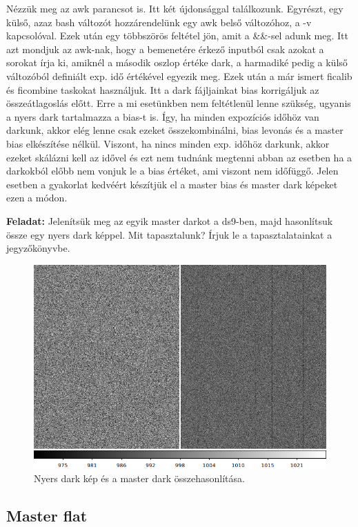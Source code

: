 \documentclass{article}
\begin{document}
Nézzük meg az awk parancsot is. Itt két újdonsággal találkozunk. Egyrészt, egy
külső, azaz bash változót hozzárendelünk egy awk belső változóhoz, a -v
kapcsolóval. Ezek után egy többszörös feltétel jön, amit a \&\&-sel adunk meg.
Itt azt mondjuk az awk-nak, hogy a bemenetére érkező inputból csak azokat a
sorokat írja ki, amiknél a második oszlop értéke dark, a harmadiké pedig a külső
változóból definiált exp. idő értékével egyezik meg.
Ezek után a már ismert ficalib és ficombine taskokat használjuk. Itt a dark
fájljainkat bias korrigáljuk az összeátlagoslás előtt. Erre a mi esetünkben nem
feltétlenül lenne szükség, ugyanis a nyers dark tartalmazza a bias-t is. Így, ha
minden expozíciós időhöz van darkunk, akkor elég lenne csak ezeket
összekombinálni, bias levonás és a master bias elkészítése nélkül. Viszont, ha
nincs minden exp. időhöz darkunk, akkor ezeket skálázni kell az idővel és ezt
nem tudnánk megtenni abban az esetben ha a darkokból előbb nem vonjuk le a bias
értéket, ami viszont nem időfüggő. Jelen esetben a gyakorlat kedvéért készítjük
el a master bias és master dark képeket ezen a módon.

{\bf Feladat:}
Jelenítsük meg az egyik master darkot a ds9-ben, majd hasonlítsuk össze egy
nyers dark képpel. Mit tapasztalunk? Írjuk le a tapasztalatainkat a
jegyzőkönyvbe.

\begin{figure}
    \centering
    \includegraphics[width=0.8\linewidth]{pics/darkcomp.png}
    \caption{Nyers dark kép és a master dark összehasonlítása.}
    \label{biascomp}
\end{figure}

\subsection{Master flat}
\end{document}
